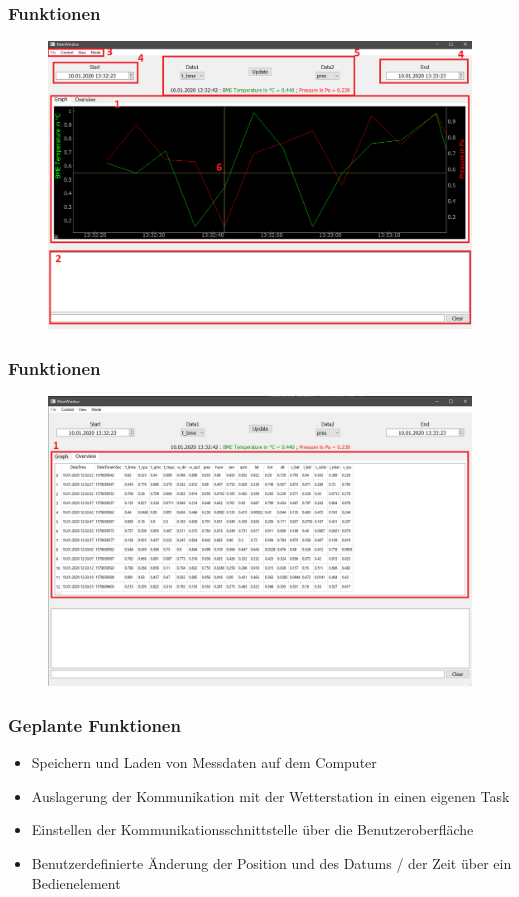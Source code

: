 \documentclass{beamer}
\begin{document}
\begin{frame}
  \frametitle{Funktionen}
  \begin{figure}[H]
    \centering
    \includegraphics[width=\textwidth]{./img/ui_simulated_graph}
  \end{figure}
\end{frame}
\begin{frame}
  \frametitle{Funktionen}
  \begin{figure}[H]
  \centering
  \includegraphics[width=\textwidth]{./img/ui_simulated_table}
\end{figure}
\end{frame}
\begin{frame}
  \frametitle{Geplante Funktionen}
  \begin{itemize}
  \item Speichern und Laden von Messdaten auf dem Computer
  \item Auslagerung der Kommunikation mit der Wetterstation in einen eigenen Task
  \item Einstellen der Kommunikationsschnittstelle über die Benutzeroberfläche
  \item Benutzerdefinierte Änderung der Position und des Datums / der Zeit über ein Bedienelement
  \end{itemize}
\end{frame}
\end{document}
